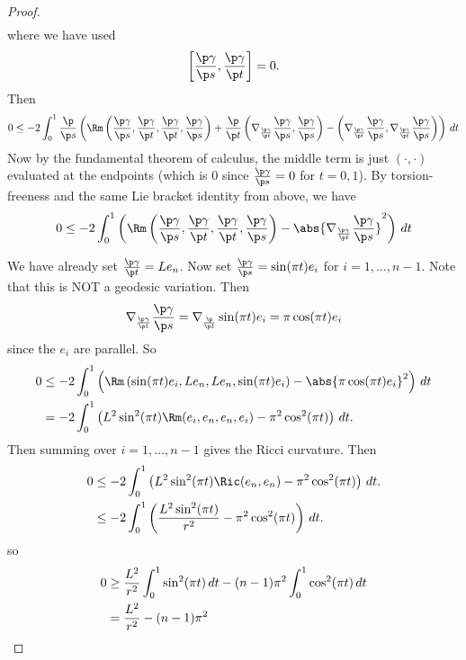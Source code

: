 \begin{proof}
\begin{align*}
  \end{align*}
  where we have used
  \[ \left[ \frac{\p\gamma}{\p s}, \frac{\p\gamma}{\p t} \right] = 0. \]
  Then
  \begin{equation*}
    0 \leq -2 \int_0^1 \frac{\p}{\p s} \left( \Rm\left( \frac{\p\gamma}{\p s}, \frac{\p\gamma}{\p t}, \frac{\p\gamma}{\p t}, \frac{\p\gamma}{\p s} \right) + \frac{\p}{\p t} \left( \nabla_{\frac{\p\gamma}{\p t}}\frac{\p\gamma}{\p s}, \frac{\p\gamma}{\p s} \right) - \left( \nabla_{\frac{\p\gamma}{\p t}}\frac{\p\gamma}{\p s}, \nabla_{\frac{\p\gamma}{\p t}}\frac{\p\gamma}{\p s} \right) \right)\,dt
  \end{equation*}
  Now by the fundamental theorem of calculus, the middle term is just $(\cdot,\cdot)$ evaluated at the endpoints (which is $0$ since $\tfrac{\p\gamma}{\p s}=0$ for $t=0,1$).
  By torsion-freeness and the same Lie bracket identity from above, we have
  \begin{equation*}
    0 \leq -2\int_0^1 \left( \Rm\left( \frac{\p\gamma}{\p s}, \frac{\p\gamma}{\p t}, \frac{\p\gamma}{\p t}, \frac{\p\gamma}{\p s} \right) - \abs{\nabla_{\frac{\p\gamma}{\p t}}\frac{\p\gamma}{\p s}}^2 \right) \, dt
  \end{equation*}

  We have already set $\tfrac{\p\gamma}{\p t}=Le_n$.
  Now set $\tfrac{\p\gamma}{\p s}=\sin(\pi t)e_i$ for $i=1,\ldots,n-1$.
  Note that this is NOT a geodesic variation.
  Then
  \[ \nabla_{\frac{\p\gamma}{\p t}}\frac{\p\gamma}{\p s} = \nabla_{\frac{\p}{\p t}} \sin(\pi t)e_i = \pi\cos(\pi t)e_i \]
  since the $e_i$ are parallel.
  So
  \begin{align*}
    0 &\leq -2 \int_0^1 \left( \Rm\left( \sin(\pi t)e_i, Le_n, Le_n, \sin(\pi t)e_i \right) - \abs{\pi\cos(\pi t)e_i}^2 \right) \, dt \\
    &= -2 \int_0^1 \left( L^2 \sin^2(\pi t) \Rm(e_i,e_n,e_n,e_i) - \pi^2 \cos^2(\pi t) \right) \, dt.
  \end{align*}
  Then summing over $i=1,\ldots,n-1$ gives the Ricci curvature.
  Then
  \begin{align*}
    0 &\leq -2 \int_0^1 \left( L^2 \sin^2(\pi t) \Ric(e_n,e_n) - \pi^2 \cos^2(\pi t) \right) \, dt. \\
    &\leq -2 \int_0^1 \left( \frac{L^2 \sin^2(\pi t)}{r^2}  - \pi^2 \cos^2(\pi t) \right) \, dt.
  \end{align*}
  so
  \begin{align*}
    0 &\geq \frac{L^2}{r^2} \int_0^1\sin^2(\pi t)\,dt - (n-1)\pi^2\int_0^1\cos^2(\pi t)\,dt \\
    &= \frac{L^2}{r^2}-(n-1)\pi^2 \qedhere
  \end{align*}
\end{proof}

